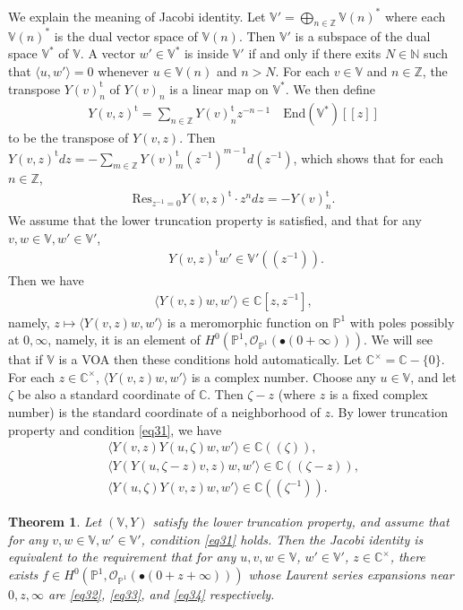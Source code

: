 \documentclass[12pt,a4paper,notitlepage]{report}
\theoremstyle{definition}
\theoremstyle{plain}
\newtheorem{thm}[df]{Theorem}
\newcommand{\tr}{\mathrm{t}} %
\newcommand{\End}{\mathrm{End}} %
\newcommand{\Res}{\mathrm{Res}}
\newcommand{\bk}[1]{\langle {#1}\rangle}
\newcommand{\scr}{\mathscr}
\newcommand{\mbb}{\mathbb}
\newcommand{\blt}{\bullet}
\newcommand{\Vbb}{\mathbb V}
\numberwithin{equation}{section}
\begin{document}
We explain the meaning of Jacobi identity. Let $\Vbb'=\bigoplus_{n\in\mbb Z}\Vbb(n)^*$ where each $\Vbb(n)^*$ is the dual vector space of $\Vbb(n)$. \index{V@$\Vbb',\Vbb^*$} Then $\Vbb'$ is a subspace of the dual space $\Vbb^*$ of $\Vbb$. A vector $w'\in\Vbb^*$ is inside $\Vbb'$ if and only if there exits $N\in\mbb N$ such that  $\bk{u,w'}=0$ whenever $u\in\Vbb(n)$ and $n>N$. For each $v\in\Vbb$ and $n\in\mbb Z$, the transpose $Y(v)_n^\tr$ of $Y(v)_n$ is a linear map on $\Vbb^*$. We then define
\begin{align*}
Y(v,z)^\tr=\sum_{n\in\mbb Z}Y(v)_n^\tr z^{-n-1}\quad\End(\Vbb^*)[[z]]
\end{align*}
to be the transpose of $Y(v,z)$. Then $Y(v,z)^\tr dz=-\sum_{m\in\mbb Z}Y(v)_m^\tr (z^{-1})^{m-1}d(z^{-1})$, which shows that for each $n\in\mbb Z$,
\begin{align}
\Res_{z^{-1}=0}Y(v,z)^\tr\cdot z^n dz=-Y(v)_n^\tr.\label{eq37}
\end{align}
We assume that the lower truncation property is satisfied, and that for any $v,w\in \Vbb,w'\in\Vbb'$,
\begin{gather}
\qquad Y(v,z)^\tr w'\in\Vbb'((z^{-1})).\label{eq31}
\end{gather}
Then we have
\begin{align*}
\bk{Y(v,z)w,w'}\in\mbb C[z,z^{-1}],
\end{align*}
namely, $z\mapsto \bk{Y(v,z)w,w'}$ is a meromorphic function on $\mbb P^1$ with poles possibly at $0,\infty$, namely, it is an element of $H^0(\mbb P^1,\scr O_{\mbb P^1}(\blt(0+\infty)))$. We will see that if $\Vbb$ is a VOA then these conditions hold automatically. Let $\mbb C^\times=\mbb C-\{0\}$. \index{C@$\mbb C^\times$} For each $z\in\mbb C^\times$, $\bk{Y(v,z)w,w'}$ is a complex number. Choose any $u\in\Vbb$, and let $\zeta$ be also a standard coordinate of $\mbb C$. Then $\zeta-z$ (where $z$ is a fixed complex number) is the standard coordinate of a neighborhood of $z$. By lower truncation property and condition \eqref{eq31}, we have
\begin{gather}
\bk{Y(v,z)Y(u,\zeta)w,w'}\in\mbb C((\zeta)),\label{eq32}\\
\bk{Y(Y(u,\zeta-z)v,z)w,w'}\in\mbb C((\zeta-z)),\label{eq33}\\
\bk{Y(u,\zeta)Y(v,z)w,w'}\in\mbb C((\zeta^{-1})).\label{eq34}
\end{gather}



\begin{thm}\label{lb19}
Let $(\Vbb,Y)$ satisfy the lower truncation property, and assume that for any $v,w\in\Vbb,w'\in\Vbb'$, condition \eqref{eq31} holds. Then the Jacobi identity is equivalent to the requirement that for any $u,v,w\in\Vbb$, $w'\in\Vbb'$, $z\in\mbb C^\times$, there exists $f\in H^0(\mbb P^1,\scr O_{\mbb P^1}(\blt (0+z+\infty)))$ whose Laurent series expansions near $0,z,\infty$ are \eqref{eq32}, \eqref{eq33}, and \eqref{eq34} respectively. 
\end{thm}
\end{document}

